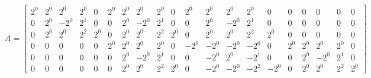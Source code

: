 \documentclass{article}%
\begin{document}
\[%
A = \left[\begin{array}{cccccccccccccccccccc}2^{0} & 2^{0} & 2^{0} & 2^{0} & 0 & 2^{0} & 2^{0} & 2^{0} & 2^{0} & 0 & 2^{0} & 2^{0} & 2^{0} & 2^{0} & 0 & 0 & 0 & 0 & 0 & 0\\0 & 2^{0} & - 2^{0} & 2^{1} & 0 & 0 & 2^{0} & - 2^{0} & 2^{1} & 0 & 0 & 2^{0} & - 2^{0} & 2^{1} & 0 & 0 & 0 & 0 & 0 & 0\\0 & 2^{0} & 2^{0} & 2^{2} & 2^{0} & 0 & 2^{0} & 2^{0} & 2^{2} & 2^{0} & 0 & 2^{0} & 2^{0} & 2^{2} & 2^{0} & 0 & 0 & 0 & 0 & 0\\0 & 0 & 0 & 0 & 0 & 2^{0} & 2^{0} & 2^{0} & 2^{0} & 0 & - 2^{0} & - 2^{0} & - 2^{0} & - 2^{0} & 0 & 2^{0} & 2^{0} & 2^{0} & 2^{0} & 0\\0 & 0 & 0 & 0 & 0 & 0 & 2^{0} & - 2^{0} & 2^{1} & 0 & 0 & - 2^{0} & 2^{0} & - 2^{1} & 0 & 0 & 2^{0} & - 2^{0} & 2^{1} & 0\\0 & 0 & 0 & 0 & 0 & 0 & 2^{0} & 2^{0} & 2^{2} & 2^{0} & 0 & - 2^{0} & - 2^{0} & - 2^{2} & - 2^{0} & 0 & 2^{0} & 2^{0} & 2^{2} & 2^{0}\end{array}\right]%
\]%
\end{document}
